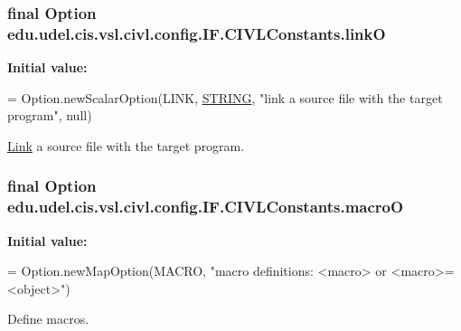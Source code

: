 \subsubsection[{link\+O}]{\setlength{\rightskip}{0pt plus 5cm}final Option edu.\+udel.\+cis.\+vsl.\+civl.\+config.\+I\+F.\+C\+I\+V\+L\+Constants.\+link\+O\hspace{0.3cm}{\ttfamily [static]}}\label{classedu_1_1udel_1_1cis_1_1vsl_1_1civl_1_1config_1_1IF_1_1CIVLConstants_a3bf647134f0f23bee0244adf7a30c78a}
{\bfseries Initial value\+:}
\begin{DoxyCode}
= Option.newScalarOption(LINK, \hyperlink{struct__STRING}{STRING},
            \textcolor{stringliteral}{"link a source file with the target program"}, null)
\end{DoxyCode}


\hyperlink{structLink}{Link} a source file with the target program. 

\hypertarget{classedu_1_1udel_1_1cis_1_1vsl_1_1civl_1_1config_1_1IF_1_1CIVLConstants_a3b642ef3af1e7a00c1f176b2ac936e43}{}
\subsubsection[{macro\+O}]{\setlength{\rightskip}{0pt plus 5cm}final Option edu.\+udel.\+cis.\+vsl.\+civl.\+config.\+I\+F.\+C\+I\+V\+L\+Constants.\+macro\+O\hspace{0.3cm}{\ttfamily [static]}}\label{classedu_1_1udel_1_1cis_1_1vsl_1_1civl_1_1config_1_1IF_1_1CIVLConstants_a3b642ef3af1e7a00c1f176b2ac936e43}
{\bfseries Initial value\+:}
\begin{DoxyCode}
= Option.newMapOption(MACRO,
            \textcolor{stringliteral}{"macro definitions: <macro> or <macro>=<object>"})
\end{DoxyCode}


Define macros. 

\hypertarget{classedu_1_1udel_1_1cis_1_1vsl_1_1civl_1_1config_1_1IF_1_1CIVLConstants_acc4f28de5ebc6896e349b4062f13c938}{}
